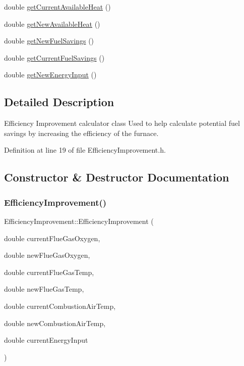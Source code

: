 \begin{DoxyCompactItemize}
\item 
double \hyperlink{class_efficiency_improvement_a4f1ef470ee88c9d3ac05be0bd5755157}{get\+Current\+Available\+Heat} ()
\item 
double \hyperlink{class_efficiency_improvement_a37df0eb5d1dc43627e947a610f2a9c08}{get\+New\+Available\+Heat} ()
\item 
double \hyperlink{class_efficiency_improvement_a1b85007b7b046b998443f5eb267822f9}{get\+New\+Fuel\+Savings} ()
\item 
double \hyperlink{class_efficiency_improvement_ab2e940be7192df960c9eb9578096796f}{get\+Current\+Fuel\+Savings} ()
\item 
double \hyperlink{class_efficiency_improvement_a3c31caaed812edb8c465b53dc9029810}{get\+New\+Energy\+Input} ()
\end{DoxyCompactItemize}


\subsection{Detailed Description}
Efficiency Improvement calculator class Used to help calculate potential fuel savings by increasing the efficiency of the furnace. 

Definition at line 19 of file Efficiency\+Improvement.\+h.



\subsection{Constructor \& Destructor Documentation}
\mbox{\label{class_efficiency_improvement_a84e4463e307cd280360a4dfbbb369c55}} 
\subsubsection{\texorpdfstring{Efficiency\+Improvement()}{EfficiencyImprovement()}}
{\footnotesize\ttfamily Efficiency\+Improvement\+::\+Efficiency\+Improvement (\begin{DoxyParamCaption}\item[{double}]{current\+Flue\+Gas\+Oxygen,  }\item[{double}]{new\+Flue\+Gas\+Oxygen,  }\item[{double}]{current\+Flue\+Gas\+Temp,  }\item[{double}]{new\+Flue\+Gas\+Temp,  }\item[{double}]{current\+Combustion\+Air\+Temp,  }\item[{double}]{new\+Combustion\+Air\+Temp,  }\item[{double}]{current\+Energy\+Input }\end{DoxyParamCaption})\hspace{0.3cm}{\ttfamily [inline]}}

